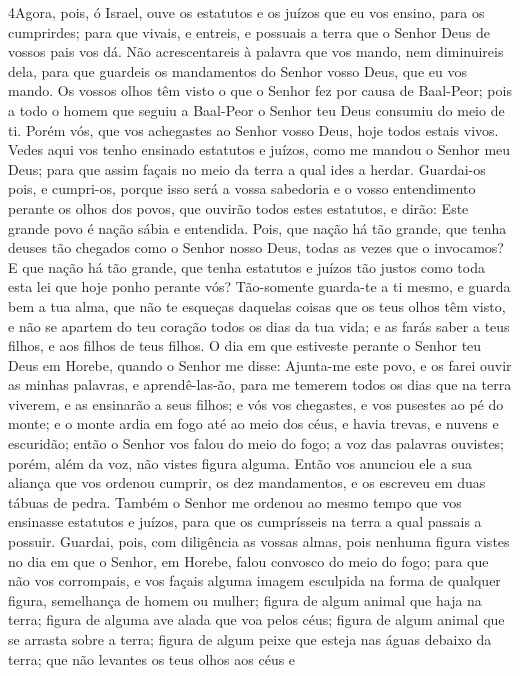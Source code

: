 \lettrine{4} Agora, pois, ó Israel, ouve os estatutos e os
juízos que eu vos ensino, para os cumprirdes; para que vivais, e
entreis, e possuais a terra que o Senhor Deus de vossos pais vos dá.
Não acrescentareis à palavra que vos mando, nem diminuireis
dela, para que guardeis os mandamentos do Senhor vosso Deus, que eu
vos mando. Os vossos olhos têm visto o que o Senhor fez por
causa de Baal-Peor; pois a todo o homem que seguiu a Baal-Peor o
Senhor teu Deus consumiu do meio de ti. Porém vós, que vos
achegastes ao Senhor vosso Deus, hoje todos estais vivos. Vedes
aqui vos tenho ensinado estatutos e juízos, como me mandou o Senhor
meu Deus; para que assim façais no meio da terra a qual ides a
herdar. Guardai-os pois, e cumpri-os, porque isso será a vossa
sabedoria e o vosso entendimento perante os olhos dos povos, que
ouvirão todos estes estatutos, e dirão: Este grande povo é nação
sábia e entendida. Pois, que nação há tão grande, que tenha
deuses tão chegados como o Senhor nosso Deus, todas as vezes que o
invocamos? E que nação há tão grande, que tenha estatutos e
juízos tão justos como toda esta lei que hoje ponho perante vós?
Tão-somente guarda-te a ti mesmo, e guarda bem a tua alma, que
não te esqueças daquelas coisas que os teus olhos têm visto, e não
se apartem do teu coração todos os dias da tua vida; e as farás
saber a teus filhos, e aos filhos de teus filhos. O dia em
que estiveste perante o Senhor teu Deus em Horebe, quando o Senhor
me disse: Ajunta-me este povo, e os farei ouvir as minhas palavras,
e aprendê-las-ão, para me temerem todos os dias que na terra
viverem, e as ensinarão a seus filhos; e vós vos chegastes, e
vos pusestes ao pé do monte; e o monte ardia em fogo até ao meio dos
céus, e havia trevas, e nuvens e escuridão; então o Senhor
vos falou do meio do fogo; a voz das palavras ouvistes; porém, além
da voz, não vistes figura alguma. Então vos anunciou ele a
sua aliança que vos ordenou cumprir, os dez mandamentos, e os
escreveu em duas tábuas de pedra. Também o Senhor me ordenou
ao mesmo tempo que vos ensinasse estatutos e juízos, para que os
cumprísseis na terra a qual passais a possuir. Guardai, pois,
com diligência as vossas almas, pois nenhuma figura vistes no dia em
que o Senhor, em Horebe, falou convosco do meio do fogo; para
que não vos corrompais, e vos façais alguma imagem esculpida na
forma de qualquer figura, semelhança de homem ou mulher;
figura de algum animal que haja na terra; figura de alguma
ave alada que voa pelos céus; figura de algum animal que se
arrasta sobre a terra; figura de algum peixe que esteja nas águas
debaixo da terra; que não levantes os teus olhos aos céus e

